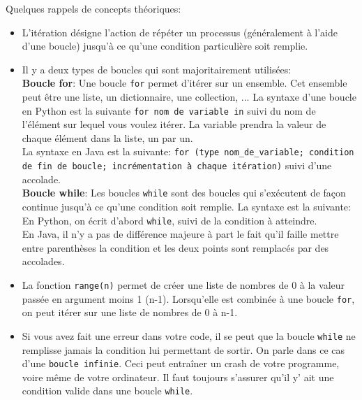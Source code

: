     Quelques rappels de concepts théoriques: \\
    
    \begin{itemize}
    	\item L'itération désigne l'action de répéter un processus (généralement à l'aide d'une boucle) jusqu'à ce qu'une condition particulière soit remplie.
    	\item Il y a deux types de boucles qui sont majoritairement utilisées: \\
    	
    	\textbf{Boucle for}: Une boucle \lstinline{for} permet d'itérer sur un ensemble. Cet ensemble peut être une liste, un dictionnaire, une collection, ... La syntaxe d'une boucle en Python est la suivante \lstinline{for nom de variable in} suivi du nom de l'élément sur lequel vous voulez itérer. La variable prendra la valeur de chaque élément dans la liste, un par un. \\
    	
    	
             	
     	La syntaxe en Java est la suivante: \lstinline{for (type nom_de_variable; condition de fin de boucle; incrémentation à chaque itération)} suivi d'une accolade. \\
     	
        	 
        \textbf{Boucle while}: Les boucles \lstinline{while} sont des boucles qui s’exécutent de façon continue jusqu’à ce qu’une condition soit remplie. La syntaxe est la suivante: En Python, on écrit d’abord \lstinline{while}, suivi de la condition à atteindre.\\
     	
     	En Java, il n'y a pas de différence majeure à part le fait qu'il faille mettre entre parenthèses la condition et les deux points sont remplacés par des accolades. \\
     	
     	
     	\item La fonction \lstinline{range(n)} permet de créer une liste de nombres de 0 à la valeur passée en argument moins 1 (n-1). Lorsqu’elle est combinée à une boucle \lstinline{for}, on peut itérer sur une liste de nombres de 0 à n-1. \\
     	
     	\item Si vous avez fait une erreur dans votre code, il se peut que la boucle \lstinline{while} ne remplisse jamais la condition lui permettant de sortir. On parle dans ce cas d'une \lstinline{boucle infinie}. Ceci peut entraîner un crash de votre programme, voire même de votre ordinateur. Il faut toujours s'assurer qu'il y' ait une condition valide dans une boucle \lstinline{while}. \\\\
     	
     	\end{itemize}
     	
